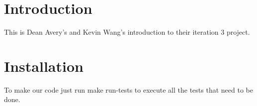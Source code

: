 \hypertarget{index_intro_sec}{}\section{Introduction}\label{index_intro_sec}
This is Dean Avery's and Kevin Wang's introduction to their iteration 3 project.\hypertarget{index_install_sec}{}\section{Installation}\label{index_install_sec}
To make our code just run make run-\/tests to execute all the tests that need to be done. 